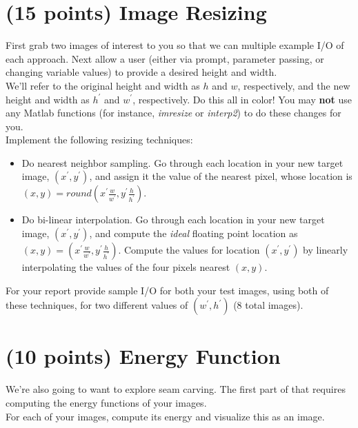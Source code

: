 \documentclass[12pt]{article}
\begin{document}
\newpage
\section{(15 points) Image Resizing}
First grab two images of interest to you so that we can multiple example I/O of each approach.   Next allow a user (either via prompt, parameter passing, or changing variable values) to provide a desired height and width.\\ 

\noindent
We'll refer to the original height and width as $h$ and $w$, respectively, and the new height and width as $h^{\prime}$ and $w^{\prime}$, respectively.  Do this all in color!  You may \textbf{not} use any Matlab functions (for instance, \emph{imresize} or \emph{interp2}) to do these changes for you.\\   

\noindent
Implement the following resizing techniques:
\begin{itemize}
\item Do nearest neighbor sampling.   Go through each location in your new target image, $(x^{\prime}, y^{\prime})$, and assign it the value of the nearest pixel, whose location is $(x, y) = round(x^{\prime} \frac{w}{w^{\prime}}, y^{\prime} \frac{h}{h^{\prime}})$.
\item Do bi-linear interpolation.   Go through each location in your new target image, $(x^{\prime}, y^{\prime})$, and compute the \emph{ideal} floating point location as $(x, y) =(x^{\prime} \frac{w}{w^{\prime}}, y^{\prime} \frac{h}{h^{\prime}})$.  Compute the values for location $(x^{\prime}, y^{\prime})$ by linearly interpolating the values of the four pixels nearest $(x,y)$.
\end{itemize}

\noindent
For your report provide sample I/O for both your test images, using both of these techniques, for two different values of $(w^{\prime}, h^{\prime})$ (8 total images).
\newpage

\section{(10 points) Energy Function}
We're also going to want to explore seam carving.  The first part of that requires computing the energy functions of your images.\\

\noindent
For each of your images, compute its energy and visualize this as an image.\\
\end{document}
